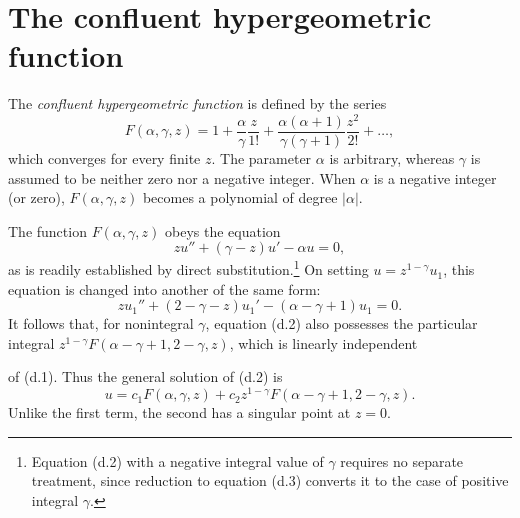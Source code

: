 \renewcommand{\thesection}{\alph{section}}
\setcounter{section}{3}
\section{The confluent hypergeometric function}
\setcounter{figure}{55}

The \emph{confluent hypergeometric function} is defined by the series
\begin{equation}
 F(\alpha,\gamma,z)=1+\frac\alpha\gamma\frac z{1!}
 +\frac{\alpha(\alpha+1)}{\gamma(\gamma+1)}\frac{z^2}{2!}+\ldots,
 \tag{d.1}
\end{equation}
which converges for every finite $z$. The parameter $\alpha$ is arbitrary,
whereas $\gamma$ is assumed to be neither zero nor a negative integer. When
$\alpha$ is a negative integer (or zero), $F(\alpha,\gamma,z)$ becomes a
polynomial of degree $|\alpha|$.

The function $F(\alpha,\gamma,z)$ obeys the equation
\begin{equation}
 zu''+(\gamma-z)u'-\alpha u=0,
 \tag{d.2}
\end{equation}
as is readily established by direct substitution.\footnote{Equation (d.2)
with a negative integral value of $\gamma$ requires no separate treatment,
since reduction to equation (d.3) converts it to the case of positive integral
$\gamma$.} On setting $u=z^{1-\gamma}u_1$, this equation is changed into
another of the same form:
\begin{equation}
 zu_1''+(2-\gamma-z)u_1'-(\alpha-\gamma+1)u_1=0.
 \tag{d.3}
\end{equation}
It follows that, for nonintegral $\gamma$, equation (d.2) also possesses the
particular integral $z^{1-\gamma}F(\alpha-\gamma+1,2-\gamma,z)$, which is
linearly independent

of (d.1). Thus the general solution of (d.2) is
\begin{equation}
 u=c_1F(\alpha,\gamma,z)+c_2z^{1-\gamma}
 F(\alpha-\gamma+1,2-\gamma,z).
 \tag{d.4}
\end{equation}
Unlike the first term, the second has a singular point at $z=0$.


